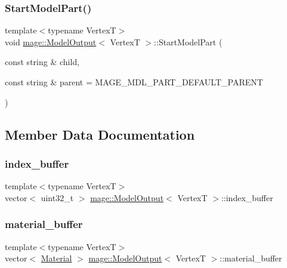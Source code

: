\hypertarget{structmage_1_1_model_output_a9e4d94547fbc318961d8c695149cdf14}{}\label{structmage_1_1_model_output_a9e4d94547fbc318961d8c695149cdf14} 
\subsubsection{\texorpdfstring{Start\+Model\+Part()}{StartModelPart()}}
{\footnotesize\ttfamily template$<$typename VertexT$>$ \\
void \hyperlink{structmage_1_1_model_output}{mage\+::\+Model\+Output}$<$ VertexT $>$\+::Start\+Model\+Part (\begin{DoxyParamCaption}\item[{const string \&}]{child,  }\item[{const string \&}]{parent = {\ttfamily MAGE\+\_\+MDL\+\_\+PART\+\_\+DEFAULT\+\_\+PARENT} }\end{DoxyParamCaption})}



\subsection{Member Data Documentation}
\hypertarget{structmage_1_1_model_output_a0c49359544b7d3c961118caa629f6405}{}\label{structmage_1_1_model_output_a0c49359544b7d3c961118caa629f6405} 
\subsubsection{\texorpdfstring{index\+\_\+buffer}{index\_buffer}}
{\footnotesize\ttfamily template$<$typename VertexT$>$ \\
vector$<$ uint32\+\_\+t $>$ \hyperlink{structmage_1_1_model_output}{mage\+::\+Model\+Output}$<$ VertexT $>$\+::index\+\_\+buffer}

\hypertarget{structmage_1_1_model_output_a66764a4d8c7e5b099e51013f385f13bf}{}\label{structmage_1_1_model_output_a66764a4d8c7e5b099e51013f385f13bf} 
\subsubsection{\texorpdfstring{material\+\_\+buffer}{material\_buffer}}
{\footnotesize\ttfamily template$<$typename VertexT$>$ \\
vector$<$ \hyperlink{structmage_1_1_material}{Material} $>$ \hyperlink{structmage_1_1_model_output}{mage\+::\+Model\+Output}$<$ VertexT $>$\+::material\+\_\+buffer}

